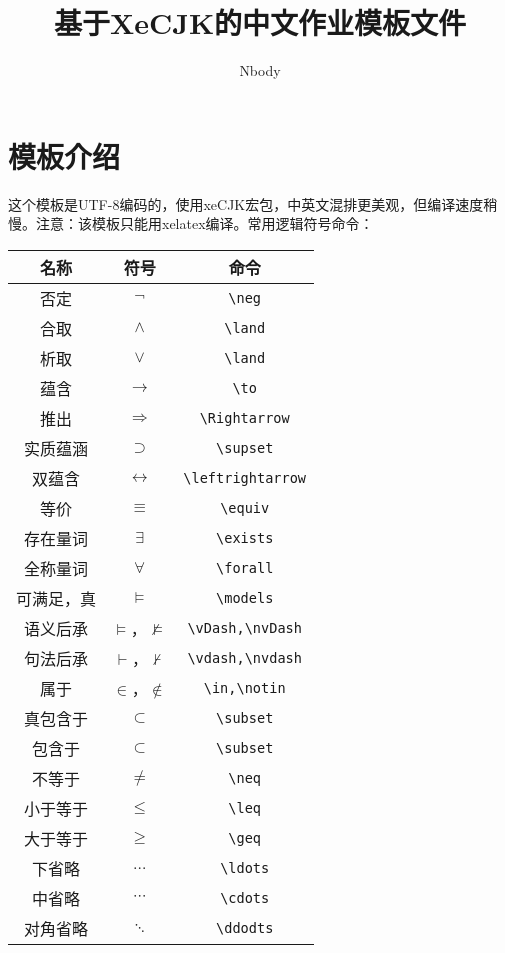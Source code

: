 \documentclass[UTF8,12pt]{article} %
\theoremstyle{definition}
\begin{document}
\title{基于XeCJK的中文作业模板文件}
\author{Nbody}
\maketitle

\section{模板介绍}
这个模板是UTF-8编码的，使用xeCJK宏包，中英文混排更美观，但编译速度稍慢。注意：该模板只能用xelatex编译。常用逻辑符号命令：
\begin{center}
\begin{tabular}{|c|c|c|}
\hline
名称      & 符号                   & 命令 \\
\hline
否定      & $\neg$                & \verb|\neg| \\
合取      & $\land$               & \verb|\land| \\
析取      & $\lor$                & \verb|\land| \\
蕴含      & $\to$                 & \verb|\to| \\
推出      & $\Rightarrow$         & \verb|\Rightarrow| \\
实质蕴涵   & $\supset$             & \verb|\supset| \\
双蕴含     & $\leftrightarrow$     & \verb|\leftrightarrow| \\
等价      & $\equiv$              & \verb|\equiv| \\
存在量词   & $\exists$             & \verb|\exists| \\
全称量词   & $\forall$             & \verb|\forall| \\
可满足，真  & $\models$            & \verb|\models| \\
语义后承   & $\vDash$，$\nvDash$   & \verb|\vDash,\nvDash| \\
句法后承   & $\vdash$，$\nvdash$   & \verb|\vdash,\nvdash| \\
属于      & $\in$，$\notin$       & \verb|\in,\notin| \\
真包含于   & $\subset$             & \verb|\subset| \\
包含于     & $\subset$            & \verb|\subset| \\
不等于     & $\neq$               & \verb|\neq| \\
小于等于   & $\leq$               & \verb|\leq| \\
大于等于   & $\geq$               & \verb|\geq| \\
下省略    & $\ldots$              & \verb|\ldots| \\
中省略    & $\cdots$              & \verb|\cdots| \\
对角省略  & $\ddots$              & \verb|\ddodts| \\
\hline 
\end{tabular}
\end{center}
\end{document}
